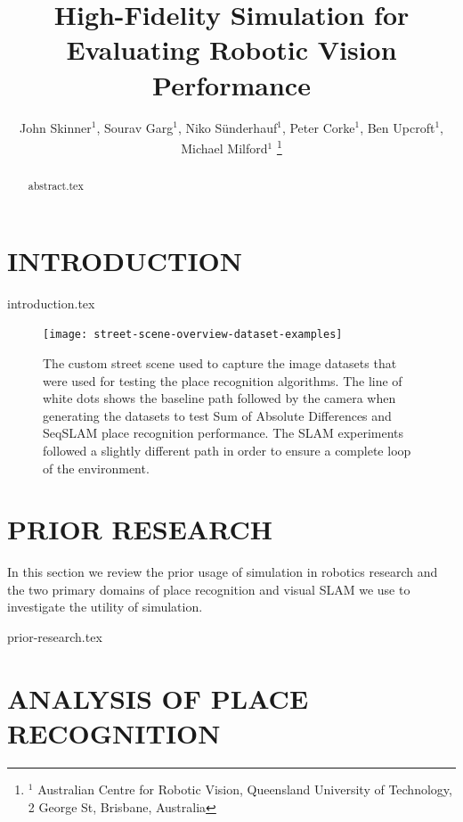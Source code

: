 \documentclass[letterpaper, 10 pt, conference]{ieeeconf}  %
\title{\LARGE \bf
High-Fidelity Simulation for Evaluating Robotic Vision Performance
}
\author{John Skinner$^{1}$, Sourav Garg$^{1}$, Niko S\"{u}nderhauf$^{1}$, Peter Corke$^{1}$, Ben Upcroft$^{1}$, Michael Milford$^{1}$%
\thanks{$^{1}$ Australian Centre for Robotic Vision,
        Queensland University of Technology,
        2 George St, Brisbane, Australia}%
}
\begin{document}
\maketitle
\thispagestyle{empty}
\pagestyle{empty}


\begin{abstract}

{abstract.tex}

\end{abstract}


\section{INTRODUCTION} \label{sec:introduction}

{introduction.tex}

\begin{figure}[t]
    \centering
    \texttt{[image: street-scene-overview-dataset-examples]}
    \caption{The custom street scene used to capture the image datasets that were used for testing the place recognition algorithms. The line of white dots shows the baseline path followed by the camera when generating the datasets to test Sum of Absolute Differences  and SeqSLAM place recognition performance. The SLAM experiments followed a slightly different path in order to ensure a complete loop of the environment.}
    \label{fig:street-scene-overview}
\end{figure}

\section{PRIOR RESEARCH} \label{sec:prior-research}

In this section we review the prior usage of simulation in robotics research and the two primary domains of place recognition and visual SLAM we use to investigate the utility of simulation.

{prior-research.tex}

\section{ANALYSIS OF PLACE RECOGNITION} \label{sec:analysis-place-rec}
\end{document}
